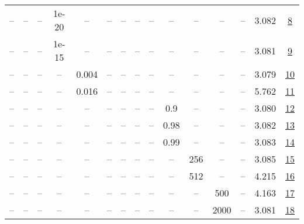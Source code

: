 \begin{table}[H]
\begin{tabular}{ccccccccccccccc}
-- & -- & -- & 1e-20 & -- & -- & -- & -- & -- & -- & -- & -- & -- & 3.082 & \href{https://wandb.ai/stanford-mercury/optimizer-scaling/runs/sweep-520m-10B-soapef35af9lr0.008-wd0.1-minlr0-warmup1000-b10.95-ff91d3}{8} \\
-- & -- & -- & 1e-15 & -- & -- & -- & -- & -- & -- & -- & -- & -- & 3.081 & \href{https://wandb.ai/stanford-mercury/optimizer-scaling/runs/sweep-520m-10B-soapere3988b4lr0.008-wd0.1-minlr0-warmup1000-b10.-d09977}{9} \\
-- & -- & -- & -- & 0.004 & -- & -- & -- & -- & -- & -- & -- & -- & 3.079 & \href{https://wandb.ai/stanford-mercury/optimizer-scaling/runs/sweep-520m-10B-soapere5a76ddlr0.004-wd0.1-minlr0-warmup1000-b10.-7df59a}{10} \\
-- & -- & -- & -- & 0.016 & -- & -- & -- & -- & -- & -- & -- & -- & 5.762 & \href{https://wandb.ai/stanford-mercury/optimizer-scaling/runs/sweep-520m-10B-soapere3bcd83lr0.016-wd0.1-minlr0-warmup1000-b10.-758213}{11} \\
-- & -- & -- & -- & -- & -- & -- & -- & -- & 0.9 & -- & -- & -- & 3.080 & \href{https://wandb.ai/stanford-mercury/optimizer-scaling/runs/sweep-520m-10B-soape1b25d4lr0.008-wd0.1-minlr0-warmup1000-b10.95-bb4d5a}{12} \\
-- & -- & -- & -- & -- & -- & -- & -- & -- & 0.98 & -- & -- & -- & 3.082 & \href{https://wandb.ai/stanford-mercury/optimizer-scaling/runs/sweep-520m-10B-soape764fd7lr0.008-wd0.1-minlr0-warmup1000-b10.95-748078}{13} \\
-- & -- & -- & -- & -- & -- & -- & -- & -- & 0.99 & -- & -- & -- & 3.083 & \href{https://wandb.ai/stanford-mercury/optimizer-scaling/runs/sweep-520m-10B-soapea85fd8lr0.008-wd0.1-minlr0-warmup1000-b10.95-2042a4}{14} \\
-- & -- & -- & -- & -- & -- & -- & -- & -- & -- & 256 & -- & -- & 3.085 & \href{https://wandb.ai/stanford-mercury/optimizer-scaling/runs/sweep-520m-10B-soapere27ec25lr0.008-wd0.1-minlr0-warmup1000-b10.-9cbc3a}{15} \\
-- & -- & -- & -- & -- & -- & -- & -- & -- & -- & 512 & -- & -- & 4.215 & \href{https://wandb.ai/stanford-mercury/optimizer-scaling/runs/sweep-520m-10B-soaperec2fec9lr0.008-wd0.1-minlr0-warmup1000-b10.-de71be}{16} \\
-- & -- & -- & -- & -- & -- & -- & -- & -- & -- & -- & 500 & -- & 4.163 & \href{https://wandb.ai/stanford-mercury/optimizer-scaling/runs/sweep-520m-10B-soapeb8c2b1lr0.008-wd0.1-minlr0-warmup500-b10.95--33bd8b}{17} \\
-- & -- & -- & -- & -- & -- & -- & -- & -- & -- & -- & 2000 & -- & 3.081 & \href{https://wandb.ai/stanford-mercury/optimizer-scaling/runs/sweep-520m-10B-soapere1fb540lr0.008-wd0.1-minlr0-warmup2000-b10.-b6ee8b}{18} \\

\end{tabular}
\end{table}

